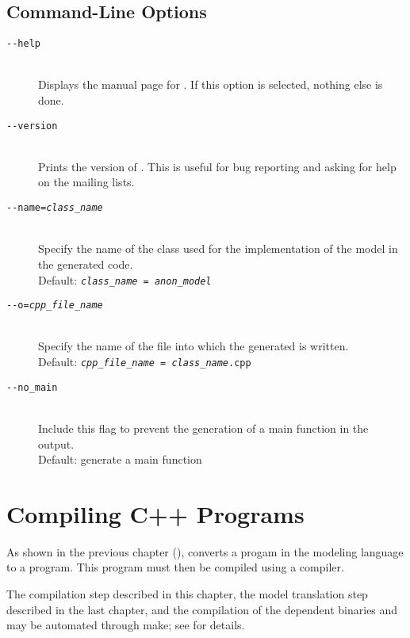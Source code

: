 \section{Command-Line Options}

\begin{description}
%
\item[\tt {-}-help] 
\mbox{ } \\ 
Displays the manual page for \stanc.  If this option is selected,
nothing else is done.
%
\item[\tt {-}-version]
\mbox{ } \\ 
Prints the version of \stanc.  This is useful for bug reporting
and asking for help on the mailing lists.
%
\item[\tt {-}-name={\slshape class\_name}]
\mbox{ } \\ 
Specify the name of the class used for the implementation of the
\Stan model in the generated \Cpp code.  
\\[2pt]
Default: {\tt {\slshape class\_name = anon\_model}}
%
\item[\tt {-}-o={\slshape cpp\_file\_name}]
\mbox{ } \\ 
Specify the name of the file into which the generated \Cpp is written.
\\[2pt]
Default: {\tt {\slshape cpp\_file\_name} = {\slshape class\_name}.cpp}
%
\item[\tt {-}-no\_main]
\mbox{ } \\
Include this flag to prevent the generation of a main function in the
output.
\\[2pt]
Default: generate a main function
\end{description}





\chapter{Compiling C++ Programs}\label{compiling-cpp.chapter}

\noindent
As shown in the previous chapter (), \Stan converts
a progam in the \Stan modeling language to a \Cpp program.  This \Cpp
program must then be compiled using a \Cpp compiler.  

The \Cpp compilation step described in this chapter, the model
translation step described in the last chapter, and the compilation of
the dependent binaries  and  may
be automated through make; see  for details.

